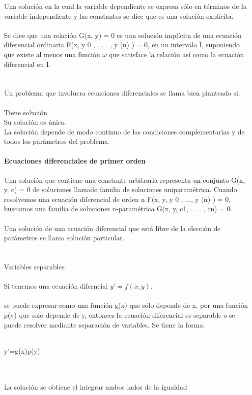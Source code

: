 \documentclass[a4paper,10pt]{article}
\begin{document}
Una solución en la cual la variable dependiente se expresa sólo
en términos de la variable independiente y las constantes se
dice que es una solución explícita.\\\\
Se dice que una relación G(x, y) = 0 es una solución implícita
de una ecuación diferencial ordinaria F(x, y
0
, . . . , y
(n)
) = 0, en
un intervalo I, suponiendo que existe al menos una función $\omega$
que satisface la relación así como la ecuación diferencial en I.\\\\\\
Un problema que involucra ecuaciones diferenciales se llama bien
planteado si:\\\\
Tiene solución\\
Su solución es única.\\
La solución depende de modo continuo de las condiciones
complementarias y de todos los parámetros del problema.\\\\
\newpage
\textbf{Ecuaciones diferenciales de primer orden}\\\\
Una solución que contiene una constante arbitraria representa un
conjunto G(x, y, c) = 0 de soluciones llamado familia de
soluciones uniparamétrica. Cuando resolvemos una ecuación
diferencial de orden n F(x, y, y 0 , ..., y (n)
) = 0, buscamos una familia de soluciones n-paramétrica G(x, y, c1, . . . , cn) = 0.\\\\
Una solución de una ecuación diferencial que está libre de la elección de parámetros se llama solución particular.\\\\\\
Variables separables\\\\
Si tenemos una ecuación diferncial $y'=f(x,y)$.\\\\
se puede expresar como una función g(x) que sólo depende de x,
por una función p(y) que solo depende de y, entonces la ecuación
diferencial es separable o se puede resolver mediante separación
de variables. Se tiene la forma:\\\\
\centerline{y'=g(x)p(y)}\\\\
La solución se obtiene el integrar ambos lados de la igualdad\\\\
\end{document}

